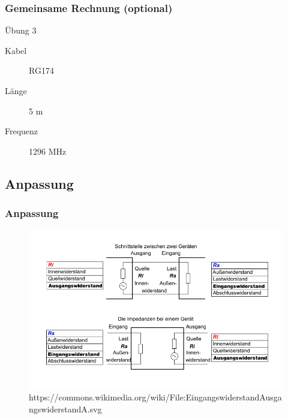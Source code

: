 \begin{frame}
  \frametitle{Gemeinsame Rechnung (optional)}
  \begin{exampleblock}{Übung 3}
    \begin{description}
      \item[Kabel] RG174
      \item[Länge] 5 m
      \item[Frequenz] 1296 MHz
    \end{description}
  \end{exampleblock}
\end{frame}


\subsection*{Anpassung}
\begin{frame}
  \frametitle{Anpassung}
  \begin{center}
    \begin{figure}
      \includegraphics[width=1\textwidth,height=.7\textheight,keepaspectratio]{e10/Anpassung.png}
                    {https://commons.wikimedia.org/wiki/File:EingangswiderstandAusgangswiderstandA.svg}{\ccpd}
    \end{figure}
  \end{center}
\end{frame}

